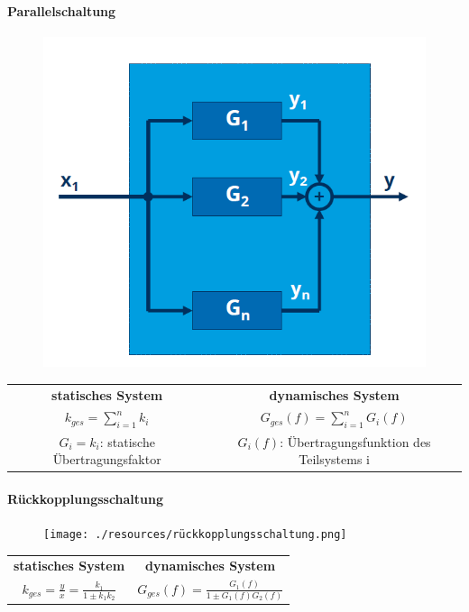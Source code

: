 \documentclass[12pt,a4paper]{article}
\begin{document}
\paragraph{Parallelschaltung}
\hspace{1pt}
\begin{figure}[H]
\includegraphics[scale=0.5]{./resources/parallelschaltung.png}
\end{figure}
\begin{tabular}{|c|c|}
\hline
\textbf{statisches System} & \textbf{dynamisches System} \\
$\displaystyle k_{ges} = \sum_{i=1}^n k_i$ & $\displaystyle G_{ges}(f) = \sum_{i=1}^n G_i(f)$\\
\hline
$G_i = k_i$: statische Übertragungsfaktor & $G_i(f)$: Übertragungsfunktion des Teilsystems i \\
\hline
\end{tabular}

\paragraph{Rückkopplungsschaltung}
\hspace{1pt}
\begin{figure}[H]
\texttt{[image: ./resources/rückkopplungsschaltung.png]}
\end{figure}
\begin{tabular}{|c|c|}
\hline
\textbf{statisches System} & \textbf{dynamisches System} \\
$\displaystyle k_{ges} = \frac{y}{x} = \frac{k_1}{1 \pm k_1 k_2}$ & $\displaystyle G_{ges}(f) = \frac{G_1(f)}{1 \pm G_1(f)G_2(f)}$\\
\hline
\end{tabular}
\end{document}
